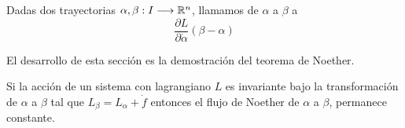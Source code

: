 \begin{definition}
	Dadas dos trayectorias $\alpha,\beta:I\longrightarrow \mathbb{R}^n$, llamamos  de $\alpha$ a $\beta$ a
	\begin{equation}
		\label{eq:flujo_noether}
		\frac{\partial L}{\partial\dot{\alpha}}(\beta-\alpha)
	\end{equation}
\end{definition}

El desarrollo de esta sección es la demostración del teorema de Noether.
\begin{theorem}
	\label{thm:noether}
	Si la acción de un sistema con lagrangiano $L$ es invariante bajo la transformación de $\alpha$ a $\beta$ tal que $L_\beta=L_\alpha+\dot{f}$ entonces el flujo de Noether de $\alpha$ a $\beta$, permanece constante.
\end{theorem}